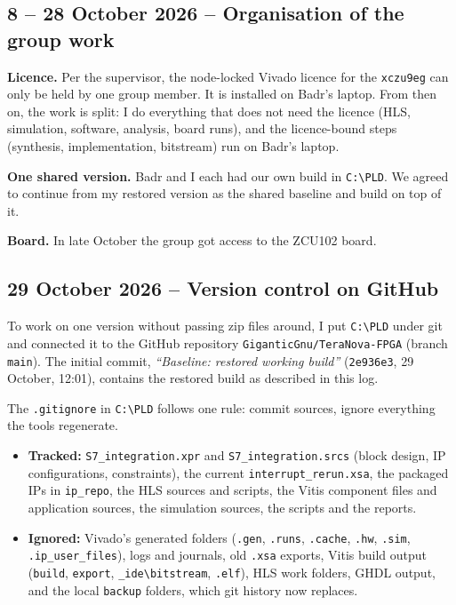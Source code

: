 \documentclass[11pt,a4paper]{article}
\newcommand{\code}[1]{\texttt{#1}}
\begin{document}
\subsection{8 -- 28 October 2026 -- Organisation of the group work}
\textbf{Licence.} Per the supervisor, the node-locked Vivado licence for the \code{xczu9eg} can only be held by one group member. It is installed on Badr's laptop. From then on, the work is split: I do everything that does not need the licence (HLS, simulation, software, analysis, board runs), and the licence-bound steps (synthesis, implementation, bitstream) run on Badr's laptop.

\textbf{One shared version.} Badr and I each had our own build in \code{C:\textbackslash PLD}. We agreed to continue from my restored version as the shared baseline and build on top of it.

\textbf{Board.} In late October the group got access to the ZCU102 board.

\subsection{29 October 2026 -- Version control on GitHub}
To work on one version without passing zip files around, I put \code{C:\textbackslash PLD} under git and connected it to the GitHub repository \code{GiganticGnu/TeraNova-FPGA} (branch \code{main}). The initial commit, \emph{``Baseline: restored working build''} (\code{2e936e3}, 29 October, 12:01), contains the restored build as described in this log.

The \code{.gitignore} in \code{C:\textbackslash PLD} follows one rule: commit sources, ignore everything the tools regenerate.
\begin{itemize}[noitemsep]
  \item \textbf{Tracked:} \code{S7\_integration.xpr} and \code{S7\_integration.srcs} (block design, IP configurations, constraints), the current \code{interrupt\_rerun.xsa}, the packaged IPs in \code{ip\_repo}, the HLS sources and scripts, the Vitis component files and application sources, the simulation sources, the scripts and the reports.
  \item \textbf{Ignored:} Vivado's generated folders (\code{.gen}, \code{.runs}, \code{.cache}, \code{.hw}, \code{.sim}, \code{.ip\_user\_files}), logs and journals, old \code{.xsa} exports, Vitis build output (\code{build}, \code{export}, \code{\_ide\textbackslash bitstream}, \code{.elf}), HLS work folders, GHDL output, and the local \code{backup} folders, which git history now replaces.
\end{itemize}
\end{document}
